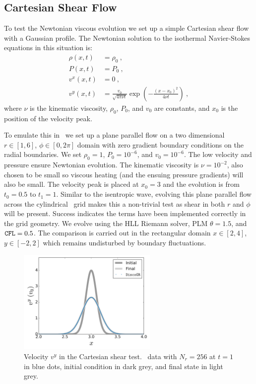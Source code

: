 \subsection{Cartesian Shear Flow}

To test the Newtonian viscous evolution we set up a simple Cartesian shear flow with a Gaussian profile.  The Newtonian solution to the isothermal Navier-Stokes equations in this situation is:
\begin{align}
	\rho(x,t) &= \rho_0\ , \\
	P(x,t) &= P_0 \ ,\\
	v^x(x,t) &= 0 \ ,\\
	v^y(x,t) &= \frac{v_0}{\sqrt{4\pi\nu t}}\exp\left(-\frac{(x-x_0)^2}{4\nu t}\right)\ ,
\end{align}
where $\nu$ is the kinematic viscosity, $\rho_0$, $P_0$, and $v_0$ are constants, and $x_0$ is the position of the velocity peak.

To emulate this in \grdisco\ we set up a plane parallel flow on a two dimensional $r\in[1,6]$, $\phi\in[0,2\pi]$ domain with zero gradient boundary conditions on the radial boundaries.  We set $\rho_0 = 1$, $P_0=10^{-6}$, and $v_0=10^{-6}$.  The low velocity and pressure ensure Newtonian evolution.  The kinematic viscosity is $\nu=10^{-2}$, also chosen to be small so viscous heating (and the ensuing pressure gradients) will also be small.  The velocity peak is placed at $x_0 = 3$ and the evolution is from $t_0 = 0.5$ to $t_1 = 1$.  Similar to the isentropic wave, evolving this plane parallel flow across the cylindrical \disco\ grid makes this a non-trivial test as shear in both $r$ and $\phi$ will be present.  Success indicates the terms have been implemented correctly in the grid geometry.  We evolve using the HLL Riemann solver, PLM $\theta = 1.5$, and ${\tt CFL}=0.5$.  The comparison is carried out in the rectangular domain $x\in[2,4]$, $y\in[-2,2]$ which remains undisturbed by boundary fluctuations.

\begin{figure}
\begin{center}
	\includegraphics[width=0.6\textwidth]{figures/numerics/cs_vy.png}
\end{center}
\caption{Velocity $v^y$ in the Cartesian shear test. \grdisco\ data with $N_r=256$ at $t=1$ in blue dots, initial condition in dark grey, and final state in light grey.  }
\end{figure}

